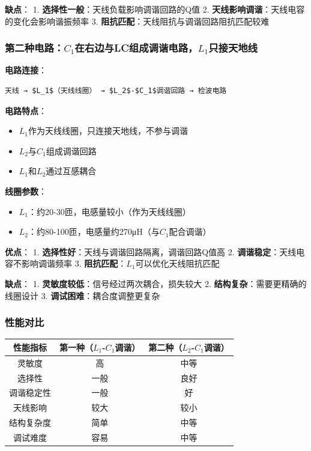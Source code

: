 \documentclass[12pt,UTF8]{ctexbook}
\begin{document}
\textbf{缺点}：
1. \textbf{选择性一般}：天线负载影响调谐回路的Q值
2. \textbf{天线影响调谐}：天线电容的变化会影响谐振频率
3. \textbf{阻抗匹配}：天线阻抗与调谐回路阻抗匹配较难

\subsubsection{第二种电路：$C_1$在右边与LC组成调谐电路，$L_1$只接天地线}

\textbf{电路连接}：\begin{verbatim}
天线 → $L_1$（天线线圈） → $L_2$-$C_1$调谐回路 → 检波电路
\end{verbatim}

\textbf{电路特点}：\begin{itemize}
  \item $L_1$作为天线线圈，只连接天地线，不参与调谐
  \item $L_2$与$C_1$组成调谐回路
  \item $L_1$和$L_2$通过互感耦合\end{itemize}

\textbf{线圈参数}：\begin{itemize}
  \item \textbf{$L_1$}：约20-30匝，电感量较小（作为天线线圈）
  \item \textbf{$L_2$}：约80-100匝，电感量约270μH（与$C_1$配合调谐）\end{itemize}

\textbf{优点}：
1. \textbf{选择性好}：天线与调谐回路隔离，调谐回路Q值高
2. \textbf{调谐稳定}：天线电容不影响调谐频率
3. \textbf{阻抗匹配}：$L_1$可以优化天线阻抗匹配

\textbf{缺点}：
1. \textbf{灵敏度较低}：信号经过两次耦合，损失较大
2. \textbf{结构复杂}：需要更精确的线圈设计
3. \textbf{调试困难}：耦合度调整更复杂

\subsubsection{性能对比}

\begin{center}
\begin{tabular}{|c|c|c|}
\hline
性能指标 & 第一种（$L_1$-$C_1$调谐） & 第二种（$L_2$-$C_1$调谐） \\
\hline
灵敏度 & 高 & 中等 \\
选择性 & 一般 & 良好 \\
调谐稳定性 & 一般 & 好 \\
天线影响 & 较大 & 较小 \\
结构复杂度 & 简单 & 中等 \\
调试难度 & 容易 & 中等 \\
\hline
\end{tabular}
\end{center}
\end{document}
